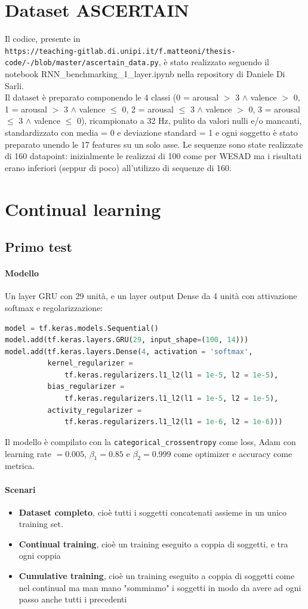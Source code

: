 \documentclass[11pt, a4paper, twoside, openright]{book}
\begin{document}
\section{Dataset ASCERTAIN}
Il codice, presente in\\\texttt{https://teaching-gitlab.di.unipi.it/f.matteoni/thesis-code/-/blob/master/ascertain\_data.py}, è stato realizzato seguendo il notebook RNN\_benchmarking\_1\_layer.ipynb nella repository di Daniele Di Sarli.\\
Il dataset è preparato componendo le 4 classi (0 = arousal $>$ 3 $\wedge$ valence $>$ 0, 1 = arousal $>$ 3 $\wedge$ valence $\leq$ 0, 2 = arousal $\leq$ 3 $\wedge$ valence $>$ 0, 3 = arousal $\leq$ 3 $\wedge$ valence $\leq$ 0), ricampionato a 32 Hz, pulito da valori nulli e/o mancanti, standardizzato con media = 0 e deviazione standard = 1 e ogni soggetto è stato preparato unendo le 17 features su un solo asse. Le sequenze sono state realizzate di 160 datapoint: inizialmente le realizzai di 100 come per WESAD ma i risultati erano inferiori (seppur di poco) all'utilizzo di sequenze di 160.
\section{Continual learning}
\subsection{Primo test}
\paragraph{Modello} Un layer GRU con 29 unità, e un layer output Dense da 4 unità con attivazione softmax e regolarizzazione:
\begin{lstlisting}[language=Python]
model = tf.keras.models.Sequential()
model.add(tf.keras.layers.GRU(29, input_shape=(100, 14)))
model.add(tf.keras.layers.Dense(4, activation = 'softmax',
          kernel_regularizer = 
              tf.keras.regularizers.l1_l2(l1 = 1e-5, l2 = 1e-5),
          bias_regularizer = 
              tf.keras.regularizers.l1_l2(l1 = 1e-5, l2 = 1e-5),
          activity_regularizer = 
              tf.keras.regularizers.l1_l2(l1 = 1e-6, l2 = 1e-6)))
\end{lstlisting}
Il modello è compilato con la \texttt{categorical\_crossentropy} come loss, Adam con learning rate $= 0.005$, $\beta_1 = 0.85$ e $\beta_2 = 0.999$ come optimizer e accuracy come metrica.
\paragraph{Scenari}
\begin{itemize}
    \item[] \textbf{Dataset completo}, cioè tutti i soggetti concatenati assieme in un unico training set.
    \item[] \textbf{Continual training}, cioè un training eseguito a coppia di soggetti, e tra ogni coppia
    \item[] \textbf{Cumulative training}, cioè un training eseguito a coppia di soggetti come nel continual ma man mano "sommiamo" i soggetti in modo da avere ad ogni passo anche tutti i precedenti
\end{itemize}
\end{document}
